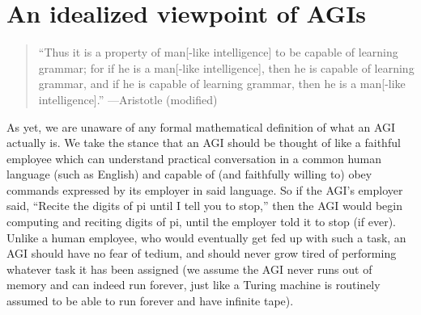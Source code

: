 \documentclass{article}
\begin{document}
\section{An idealized viewpoint of AGIs}
\label{agiperspectivesection}

\begin{quote}
    ``Thus it is a property of man[-like intelligence] to be capable of learning
    grammar; for if he is a man[-like intelligence], then he is capable of learning
    grammar, and if he is capable of learning grammar, then he is
    a man[-like intelligence].'' ---Aristotle \cite{aristotle} (modified)
\end{quote}

As yet, we are unaware of any formal mathematical definition of what an AGI
actually is. We take the stance that an AGI should be thought of like a faithful
employee which can understand
practical conversation in a common human language (such as
English) and capable of (and faithfully willing to) obey commands
expressed by its employer in said language.
So if the AGI's employer said, ``Recite the digits of pi until I tell you to
stop,'' then the AGI would begin computing and reciting digits of pi, until the
employer told it to stop (if ever). Unlike a human employee, who would eventually
get fed up with such a task, an AGI should have no fear of tedium, and should
never grow tired of performing whatever task it has been assigned (we assume
the AGI never runs out of memory and can indeed run forever, just like a Turing
machine is routinely assumed to be able to run forever and have infinite tape).
\end{document}
